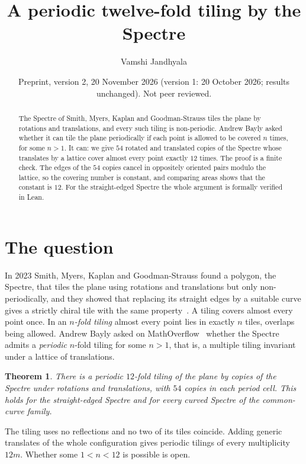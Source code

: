 \documentclass[11pt]{amsart}
\title{A periodic twelve-fold tiling by the Spectre}
\author{Vamshi Jandhyala}
\date{Preprint, version 2, 20 November 2026 (version 1: 20 October 2026; results unchanged). Not peer reviewed.}
\newtheorem{theorem}{Theorem}
\theoremstyle{remark}
\begin{document}
\begin{abstract}
The Spectre of Smith, Myers, Kaplan and Goodman-Strauss tiles the plane by rotations and translations,
and every such tiling is non-periodic. Andrew Bayly asked whether it can tile the plane periodically if
each point is allowed to be covered $n$ times, for some $n>1$. It can: we give $54$ rotated and translated
copies of the Spectre whose translates by a lattice cover almost every point exactly $12$ times. The
proof is a finite check. The edges of the $54$ copies cancel in oppositely oriented pairs modulo the
lattice, so the covering number is constant, and comparing areas shows that the constant is $12$. For
the straight-edged Spectre the whole argument is formally verified in Lean.
\end{abstract}

\maketitle

\section{The question}

In 2023 Smith, Myers, Kaplan and Goodman-Strauss found a polygon, the Spectre, that tiles the plane using
rotations and translations but only non-periodically, and they showed that replacing its straight edges by
a suitable curve gives a strictly chiral tile with the same property~\cite{SMKG}. A tiling covers almost
every point once. In an \emph{$n$-fold tiling} almost every point lies in exactly $n$ tiles, overlaps being
allowed. Andrew Bayly asked on MathOverflow~\cite{MO} whether the Spectre admits a \emph{periodic}
$n$-fold tiling for some $n>1$, that is, a multiple tiling invariant under a lattice of translations.

\begin{theorem}\label{thm:main}
There is a periodic $12$-fold tiling of the plane by copies of the Spectre under rotations and
translations, with $54$ copies in each period cell. This holds for the straight-edged Spectre and for every
curved Spectre of the common-curve family.
\end{theorem}

The tiling uses no reflections and no two of its tiles coincide. Adding generic translates of the whole
configuration gives periodic tilings of every multiplicity $12m$. Whether some $1<n<12$ is possible is
open.
\end{document}
